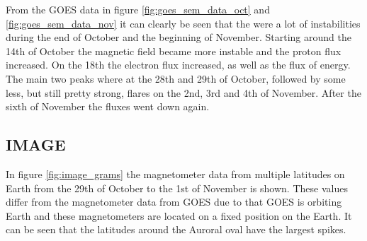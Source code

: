 From the GOES data in figure \ref{fig:goes_sem_data_oct} and \ref{fig:goes_sem_data_nov} it can clearly be seen that the were a lot of instabilities during the end of October and the beginning of November. Starting around the 14th of October the magnetic field became more instable and the proton flux increased. On the 18th the electron flux increased, as well as the flux of energy. The main two peaks where at the 28th and 29th of October, followed by some less, but still pretty strong, flares on the 2nd, 3rd and 4th of November. After the sixth of November the fluxes went down again.


\subsection{IMAGE}

In figure \ref{fig:image_grams} the magnetometer data from multiple latitudes on Earth from the 29th of October to the 1st of November is shown. These values differ from the magnetometer data from GOES due to that GOES is orbiting Earth and these magnetometers are located on a fixed position on the Earth. It can be seen that the latitudes around the Auroral oval have the largest spikes. 

